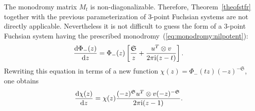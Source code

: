 \documentclass[pdftex]{sigma}
\def\mf{\mathfrak}
\numberwithin{equation}{section}
\begin{document}
The monodromy matrix $M_t$ is non-diagonalizable. Therefore, Theorem~\ref{theofstfr} together with the previous parameterization of 3-point Fuchsian systems are not directly applicable. Nevertheless it is not difficult to guess the form of a 3-point Fuchsian system having the prescribed monodromy~(\ref{eq:monodromy:nilpotent}):
\begin{gather}
\frac{{\rm d}\Phi_-(z)}{{\rm d}z}=\Phi_-(z)\left[\frac{\mathfrak S}{z}+ \frac{u^T\otimes v }{2\pi{\rm i}(z-t)}\right].\label{FscF}
\end{gather}
Rewriting this equation in terms of a new function $\chi(z)=\Phi_-(tz) (-z)^{-\mf S}$, one obtains
\begin{gather*}
\frac{{\rm d}\chi(z)}{{\rm d}z}=\chi(z)\frac{ (-z)^{\mf S} u^T\otimes v (-z)^{-\mf S}}{2\pi{\rm i}(z-1)} .
\end{gather*}
\end{document}
